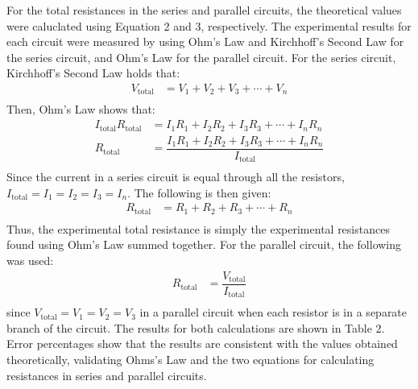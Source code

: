 \documentclass [12pt, letterpaper, twoside] {article}
\begin{document}
For the total resistances in the series and parallel circuits, the theoretical values were caluclated using Equation 2 and 3, respectively. The experimental results for each circuit were measured by using Ohm's Law and Kirchhoff's Second Law for the series circuit, and Ohm's Law for the parallel circuit. For the series circuit, Kirchhoff's Second Law holds that:
\begin{equation}
  \begin{split}
    V_{\text{total}} &= V_{1} + V_{2} + V_{3} + \cdots + V_{n} \\
  \end{split}
\end{equation}
Then, Ohm's Law shows that:
\begin{equation}
  \begin{split}
    I_{\text{total}}R_{\text{total}} &= I_{1}R_{1} + I_{2}R_{2} + I_{3}R_{3} + \cdots + I_{n}R_{n} \\
    R_{\text{total}} &= \dfrac{I_{1}R_{1} + I_{2}R_{2} + I_{3}R_{3} + \cdots + I_{n}R_{n}}{I_{\text{total}}} \\
  \end{split}
\end{equation}
Since the current in a series circuit is equal through all the resistors, \(I_{\text{total}} = I_{1} = I_{2} = I_{3} = I_{n}\). The following is then given:
\begin{equation*}
  \begin{split}
    R_{\text{total}} &= R_{1} + R_{2} + R_{3} + \cdots + R_{n} \\
  \end{split}
\end{equation*}
Thus, the experimental total resistance is simply the experimental resistances found using Ohm's Law summed together. For the parallel circuit, the following was used:
\begin{equation*}
  \begin{split}
    R_{\text{total}} &= \dfrac{V_{\text{total}}}{I_{\text{total}}} \\
  \end{split}
\end{equation*}
since \(V_{\text{total}} = V_{1} = V_{2} = V_{3}\) in a parallel circuit when each resistor is in a separate branch of the circuit. The results for both calculations are shown in Table 2. Error percentages show that the results are consistent with the values obtained theoretically, validating Ohms's Law and the two equations for calculating resistances in series and parallel circuits.
\end{document}
